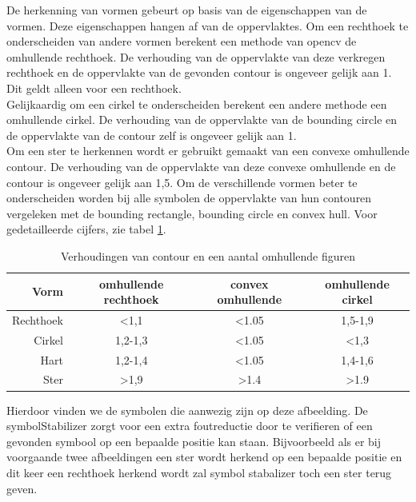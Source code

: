 \documentclass[eind]{penoverslag}
\begin{document}
De herkenning van vormen gebeurt op basis van de eigenschappen van de vormen. Deze eigenschappen hangen af van de oppervlaktes.
Om een rechthoek te onderscheiden van andere vormen berekent een methode van opencv de omhullende rechthoek. De verhouding van de oppervlakte van deze verkregen rechthoek en de oppervlakte van de gevonden contour is ongeveer gelijk aan 1. Dit geldt alleen voor een rechthoek. \\
Gelijkaardig om een cirkel te onderscheiden berekent een andere methode een omhullende cirkel. De verhouding van de oppervlakte van de bounding circle en de oppervlakte van de contour zelf is ongeveer gelijk aan 1.\\
Om een ster te herkennen wordt er gebruikt gemaakt van een convexe omhullende contour. De verhouding van de oppervlakte van deze convexe omhullende en de contour is ongeveer gelijk aan 1,5. Om de verschillende vormen beter te onderscheiden worden bij alle symbolen de oppervlakte van hun contouren vergeleken met de bounding rectangle, bounding circle en convex hull. Voor gedetailleerde cijfers, zie tabel \ref{recognitionTable}.\\


\begin{table}[h]
\begin{center}
\begin{tabular}{r|c|c|c}

Vorm		&	omhullende rechthoek	&	convex omhullende	&	omhullende cirkel\\
\hline
						
Rechthoek	&	\textless1,1		&	\textless1.05		&	1,5-1,9\\
Cirkel		&	1,2-1,3			&	\textless1.05		&	\textless1,3\\
Hart		&	1,2-1,4			&	\textless1.05		&	1,4-1,6\\
Ster		&	\textgreater1,9		&	\textgreater1.4		&	\textgreater1.9\\

\end{tabular}
\caption{Verhoudingen van contour en een aantal omhullende figuren}
\label{recognitionTable}

\end{center}
\end{table}


Hierdoor vinden we de symbolen die aanwezig zijn op deze afbeelding. De symbolStabilizer zorgt voor een extra foutreductie door te verifieren of een gevonden symbool op een bepaalde positie kan staan. Bijvoorbeeld als er bij voorgaande twee afbeeldingen een ster wordt herkend op een bepaalde positie en dit keer een rechthoek herkend wordt zal symbol stabalizer toch een ster terug geven. \\ 
\end{document}
